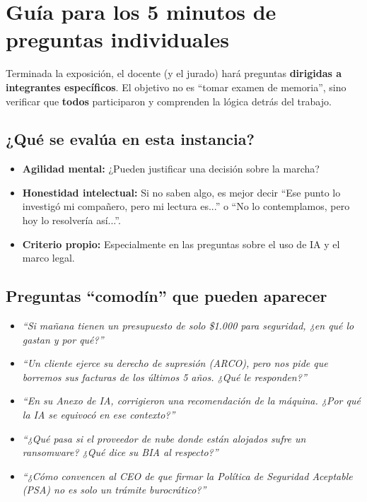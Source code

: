 \documentclass[12pt,a4paper]{article}
\begin{document}
\newpage
\section{Gu\'ia para los 5 minutos de preguntas individuales}

Terminada la exposici\'on, el docente (y el jurado) har\'a preguntas \textbf{dirigidas a integrantes espec\'ificos}. El objetivo no es ``tomar examen de memoria'', sino verificar que \textbf{todos} participaron y comprenden la l\'ogica detr\'as del trabajo.

\subsection{¿Qu\'e se eval\'ua en esta instancia?}
\begin{itemize}[leftmargin=2em]
    \item \textbf{Agilidad mental:} ¿Pueden justificar una decisi\'on sobre la marcha?
    \item \textbf{Honestidad intelectual:} Si no saben algo, es mejor decir ``Ese punto lo investig\'o mi compa\~nero, pero mi lectura es...'' o ``No lo contemplamos, pero hoy lo resolver\'ia as\'i...''.
    \item \textbf{Criterio propio:} Especialmente en las preguntas sobre el uso de IA y el marco legal.
\end{itemize}

\subsection{Preguntas ``comod\'in'' que pueden aparecer}
\begin{cajaExamen}[title={Prep\'arense para estas preguntas}]
\begin{itemize}[leftmargin=2em]
    \item \emph{``Si ma\~nana tienen un presupuesto de solo \$1.000 para seguridad, ¿en qu\'e lo gastan y por qu\'e?''}
    \item \emph{``Un cliente ejerce su derecho de supresi\'on (ARCO), pero nos pide que borremos sus facturas de los \'ultimos 5 a\~nos. ¿Qu\'e le responden?''}
    \item \emph{``En su Anexo de IA, corrigieron una recomendaci\'on de la m\'aquina. ¿Por qu\'e la IA se equivoc\'o en ese contexto?''}
    \item \emph{``¿Qu\'e pasa si el proveedor de nube donde est\'an alojados sufre un ransomware? ¿Qu\'e dice su BIA al respecto?''}
    \item \emph{``¿C\'omo convencen al CEO de que firmar la Pol\'itica de Seguridad Aceptable (PSA) no es solo un tr\'amite burocr\'atico?''}
\end{itemize}
\end{cajaExamen}
\end{document}

